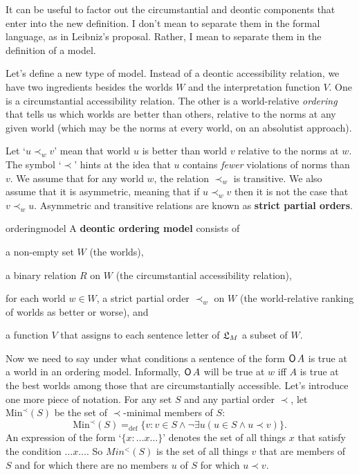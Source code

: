 It can be useful to factor out the circumstantial and deontic components that
enter into the new definition. I don't mean to separate them in the formal
language, as in Leibniz's proposal. Rather, I mean to separate them in the
definition of a model.

Let's define a new type of model. Instead of a deontic accessibility relation,
we have two ingredients besides the worlds $W$ and the interpretation
function $V$. One is a circumstantial accessibility relation. The other is a
world-relative \emph{ordering} that tells us which worlds are better than others,
relative to the norms at any given world (which may be the norms at every world,
on an absolutist approach).

Let `$u \prec_w v$' mean that world $u$ is better than world $v$ relative to the
norms at $w$. The symbol `$\prec$' hints at the idea that $u$ contains
\emph{fewer} violations of norms than $v$. We assume that for any world $w$,
the relation $\prec_w$ is transitive. We also assume that it is asymmetric,
meaning that if $u \prec_w v$ then it is not the case that $v \prec_w u$.
Asymmetric and transitive relations are known as \textbf{strict partial orders}.

\begin{definition}{}{orderingmodel}
  A \textbf{deontic ordering model} consists of
  \vspace{-3mm}
  \begin{itemize*}
    \item a non-empty set $W$ (the worlds),
    \item a binary relation $R$ on $W$ (the circumstantial accessibility
    relation),
    \item for each world $w\in W$, a strict partial order $\prec_w$ on $W$ (the
    world-relative ranking of worlds as better or worse), and
    \item a function $V$ that assigns to each sentence letter of $\mathfrak{L}_M$ a subset
    of $W$.
  \end{itemize*}
\end{definition}

Now we need to say under what conditions a sentence of the form $\operatorname{\mathsf{O}} A$ is true
at a world in an ordering model. Informally, $\operatorname{\mathsf{O}} A$ will be true at $w$ iff
$A$ is true at the best worlds among those that are circumstantially accessible.
Let's introduce one more piece of notation. For any set $S$ and any
partial order $\prec$, let $\mathrm{Min}^{\prec}(S)$ be the set of $\prec$-minimal
members of $S$:
\[
  \mathrm{Min}^{\prec}(S) =_\text{def} \{ v: v \in S \land \neg\exists u(u \in S \land u \prec v) \}.
\]
An expression of the form `$\{ x: \ldots x \ldots \}$' denotes the set of all
things $x$ that satisfy the condition $\ldots x \ldots$. So $Min^{<}(S)$ is the
set of all things $v$ that are members of $S$ and for which there are no members
$u$ of $S$ for which $u \prec v$.

